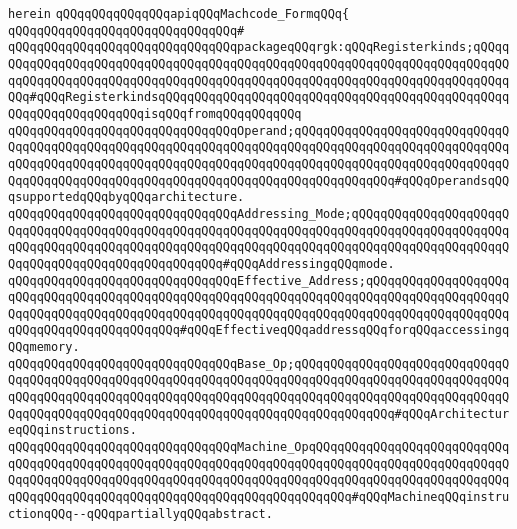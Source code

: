 \verb|herein|\newline
\newline
\verb|qQQqqQQqqQQqqQQqapiqQQqMachcode_FormqQQq{|\newline
\verb|qQQqqQQqqQQqqQQqqQQqqQQqqQQqqQQq#|\newline
\verb|qQQqqQQqqQQqqQQqqQQqqQQqqQQqqQQqpackageqQQqrgk:qQQqRegisterkinds;qQQqqQQqqQQqqQQqqQQqqQQqqQQqqQQqqQQqqQQqqQQqqQQqqQQqqQQqqQQqqQQqqQQqqQQqqQQqqQQqqQQqqQQqqQQqqQQqqQQqqQQqqQQqqQQqqQQqqQQqqQQqqQQqqQQqqQQqqQQqqQQqqQQq#qQQqRegisterkindsqQQqqQQqqQQqqQQqqQQqqQQqqQQqqQQqqQQqqQQqqQQqqQQqqQQqqQQqqQQqqQQqqQQqisqQQqfromqQQqqQQqqQQq|\newline
\newline
\verb|qQQqqQQqqQQqqQQqqQQqqQQqqQQqqQQqOperand;qQQqqQQqqQQqqQQqqQQqqQQqqQQqqQQqqQQqqQQqqQQqqQQqqQQqqQQqqQQqqQQqqQQqqQQqqQQqqQQqqQQqqQQqqQQqqQQqqQQqqQQqqQQqqQQqqQQqqQQqqQQqqQQqqQQqqQQqqQQqqQQqqQQqqQQqqQQqqQQqqQQqqQQqqQQqqQQqqQQqqQQqqQQqqQQqqQQqqQQqqQQqqQQqqQQqqQQqqQQqqQQq#qQQqOperandsqQQqsupportedqQQqbyqQQqarchitecture.|\newline
\verb|qQQqqQQqqQQqqQQqqQQqqQQqqQQqqQQqAddressing_Mode;qQQqqQQqqQQqqQQqqQQqqQQqqQQqqQQqqQQqqQQqqQQqqQQqqQQqqQQqqQQqqQQqqQQqqQQqqQQqqQQqqQQqqQQqqQQqqQQqqQQqqQQqqQQqqQQqqQQqqQQqqQQqqQQqqQQqqQQqqQQqqQQqqQQqqQQqqQQqqQQqqQQqqQQqqQQqqQQqqQQqqQQqqQQqqQQq#qQQqAddressingqQQqmode.|\newline
\verb|qQQqqQQqqQQqqQQqqQQqqQQqqQQqqQQqEffective_Address;qQQqqQQqqQQqqQQqqQQqqQQqqQQqqQQqqQQqqQQqqQQqqQQqqQQqqQQqqQQqqQQqqQQqqQQqqQQqqQQqqQQqqQQqqQQqqQQqqQQqqQQqqQQqqQQqqQQqqQQqqQQqqQQqqQQqqQQqqQQqqQQqqQQqqQQqqQQqqQQqqQQqqQQqqQQqqQQqqQQqqQQq#qQQqEffectiveqQQqaddressqQQqforqQQqaccessingqQQqmemory.|\newline
\verb|qQQqqQQqqQQqqQQqqQQqqQQqqQQqqQQqBase_Op;qQQqqQQqqQQqqQQqqQQqqQQqqQQqqQQqqQQqqQQqqQQqqQQqqQQqqQQqqQQqqQQqqQQqqQQqqQQqqQQqqQQqqQQqqQQqqQQqqQQqqQQqqQQqqQQqqQQqqQQqqQQqqQQqqQQqqQQqqQQqqQQqqQQqqQQqqQQqqQQqqQQqqQQqqQQqqQQqqQQqqQQqqQQqqQQqqQQqqQQqqQQqqQQqqQQqqQQqqQQqqQQq#qQQqArchitectureqQQqinstructions.|\newline
\newline
\verb|qQQqqQQqqQQqqQQqqQQqqQQqqQQqqQQqMachine_OpqQQqqQQqqQQqqQQqqQQqqQQqqQQqqQQqqQQqqQQqqQQqqQQqqQQqqQQqqQQqqQQqqQQqqQQqqQQqqQQqqQQqqQQqqQQqqQQqqQQqqQQqqQQqqQQqqQQqqQQqqQQqqQQqqQQqqQQqqQQqqQQqqQQqqQQqqQQqqQQqqQQqqQQqqQQqqQQqqQQqqQQqqQQqqQQqqQQqqQQqqQQqqQQqqQQqqQQq#qQQqMachineqQQqinstructionqQQq--qQQqpartiallyqQQqabstract.|\newline
